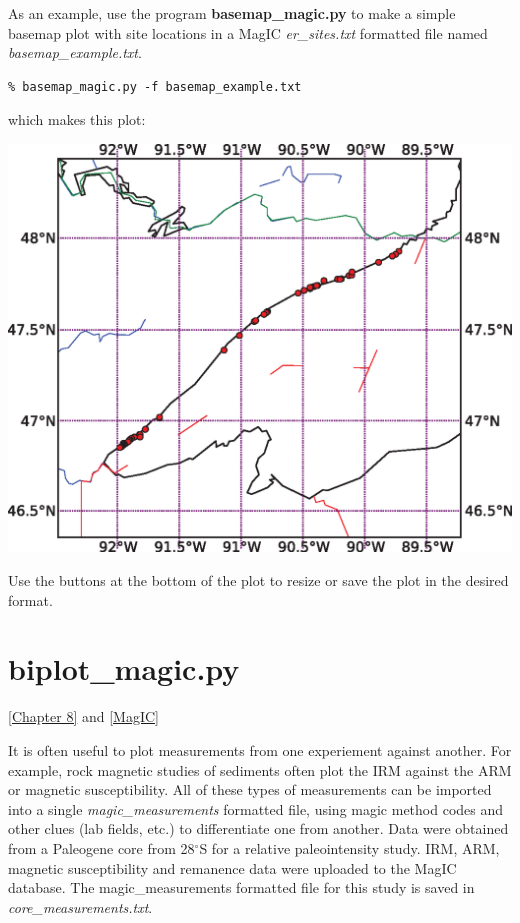 \documentclass[11pt]{book}
\begin{document}
{{{{{As an example, use the program {\bf basemap\_magic.py} to make  a simple basemap plot with site locations in a MagIC {\it er\_sites.txt}  formatted file named {\it basemap\_example.txt}.  

\begin{verbatim}
% basemap_magic.py -f basemap_example.txt 
\end{verbatim}

\noindent which makes this plot:




\includegraphics[width= 15 cm]{EPSfiles/basemap.eps}

  Use the buttons at the bottom of the plot to resize or save the plot in the desired format.  


\section {\bf biplot\_magic.py} 
\label{ex:biplot_magic}
\href{http://Webbookcopy.html#Applied_rock_magnetism}{
[Chapter 8]} and \href{#MagIC}{[MagIC]}

It is often useful to plot measurements from one experiement against another.  For example, rock magnetic studies of sediments often plot the IRM against the ARM or magnetic susceptibility.  All of these types of measurements can be imported into a single {\it magic\_measurements} formatted file, using magic method codes and other clues (lab fields, etc.) to differentiate one from another.  
Data  were obtained from a Paleogene core from 28$^{\circ}$S for a relative paleointensity study.    IRM, ARM, magnetic susceptibility and remanence data were uploaded to the MagIC database.  The magic\_measurements formatted file for this study is saved in {\it core\_measurements.txt}.  

}}}}}
\end{document}
